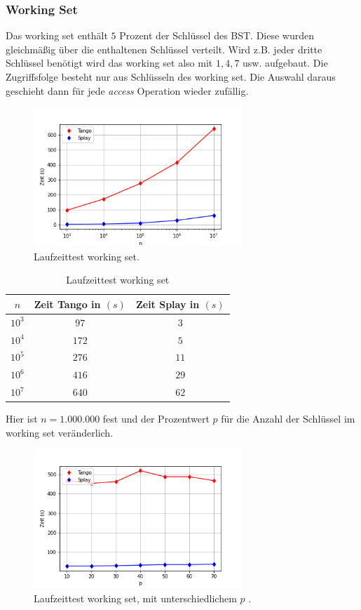 \documentclass[a4paper,12pt]{article}
\begin{document}
\subsubsection{Working Set}
Das working set enthält $5$ Prozent der Schlüssel des BST. Diese wurden gleichmäßig über die enthaltenen Schlüssel verteilt. Wird z.B. jeder dritte Schlüssel benötigt wird das working set also mit $1, 4, 7$ usw. aufgebaut.  Die Zugriffsfolge besteht nur aus Schlüsseln des working set. Die Auswahl daraus geschieht dann für jede \textit{access} Operation wieder zufällig.
\begin{figure}[H]
	\centering
	\includegraphics[width=0.7\textwidth]{"Medien/laufzeittest/diagramm/workingset"}
	\caption{Laufzeittest working set.}
\end{figure}
\begin{table}[H]
	\begin{center}
		\begin{tabular}[c]{|c|c|c|}
			\hline
			$n$ & Zeit Tango in $\left(s\right)$ &Zeit Splay in $\left(s\right)$ \\
			\hline
			$10^3$ & $97$ &$3$ \\
			\hline
			$10^4$  & $172$ &$5$  \\
			\hline
			$10^5$  & $276$ &$11$  \\
			\hline
			$10^6$  & $416$ &$29$  \\
			\hline
			$10^7$  & $640$ &$62$  \\
			\hline
		\end{tabular}
		\caption{Laufzeittest working set} 
	\end{center}
\end{table}
\noindent Hier ist $n = 1.000.000$ fest und der Prozentwert $p$ für die Anzahl der Schlüssel im working set veränderlich.
\begin{figure}[H]
	\centering
	\includegraphics[width=0.7\textwidth]{"Medien/laufzeittest/diagramm/workingset2"}
	\caption{Laufzeittest working set, mit unterschiedlichem $p$ .}
\end{figure}
\end{document}
